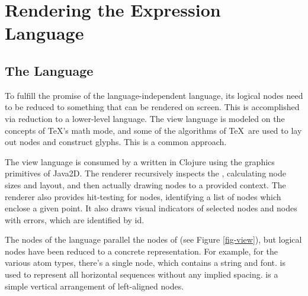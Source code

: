 %
%
\section{Rendering the Expression Language}

\subsection{The  Language}
\label{view}
To fulfill the promise of the language-independent  language, its logical nodes need to be reduced to something that can be rendered on screen. This is accomplished via reduction to a lower-level  language. The view language is modeled on the concepts of \TeX's math mode\cite{tex-math}, and some of the algorithms of \TeX\ are used to lay out nodes and construct glyphs. This is a common approach\cite{mathml}.

The view language is consumed by a  written in Clojure using the graphics primitives of Java2D\cite{java2d}. The renderer recursively inspects the , calculating node sizes and layout, and then actually drawing nodes to a provided context.
The renderer also provides hit-testing for nodes, identifying a list of  nodes which enclose a given point. It also draws visual indicators of selected nodes and nodes with errors, which are identified by id.











The nodes of the  language parallel the nodes of  (see Figure \ref{fig-view}), but logical nodes have been reduced to a concrete representation. For example, for the various atom types, there's a single  node, which contains a string and font.  is used to represent all horizontal sequences without any implied spacing.  is a simple vertical arrangement of left-aligned nodes.

